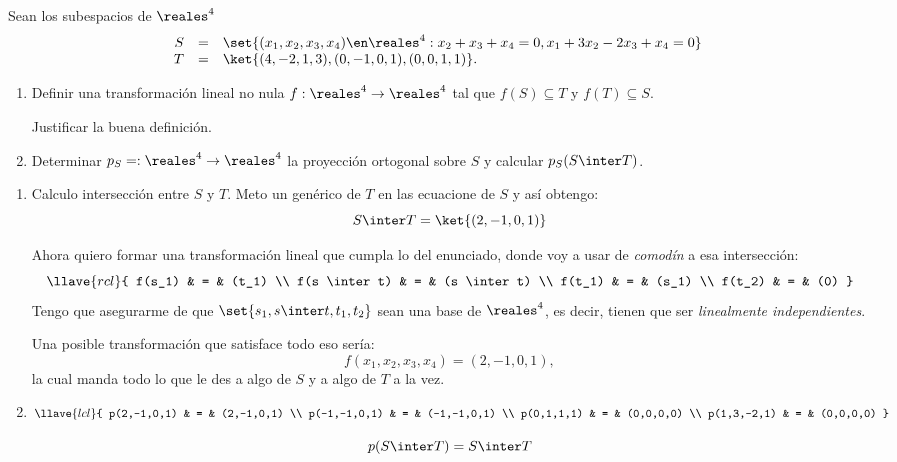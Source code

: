 \begin{enunciado}{\ejExtra}
  Sean los subespacios de $\reales^4$
  $$
    \begin{array}{rcl}
      S & = & \set{(x_1, x_2, x_3, x_4) \en \reales^4 : x_2 + x_3 + x_4 = 0, x_1 + 3x_2 - 2x_3 + x_4 = 0} \\
      T & = & \ket{(4, -2, 1, 3), (0, -1, 0, 1), (0,0,1,1)}.
    \end{array}
  $$
  \begin{enumerate}[label=\alph*)]
    \item Definir una transformación lineal no nula $f: \reales^4 \to \reales^4$ tal que $f(S) \subseteq T$ y
          $f(T) \subseteq S$.

          Justificar la buena definición.

    \item Determinar $p_S = : \reales^4 \to \reales^4$ la proyección ortogonal sobre $S$ y calcular $p_S(S \inter T)$.
  \end{enumerate}
\end{enunciado}

\begin{enumerate}[label=\alph*)]
  \item Calculo intersección entre $S$ y $T$. Meto un genérico de $T$ en las ecuacione de $S$ y así obtengo:
        $$
          S \inter T = \ket{(2,-1,0,1)}
        $$

        Ahora quiero formar una transformación lineal que cumpla lo del enunciado, donde voy a usar de \textit{comodín}
        a esa intersección:
        $$
          \llave{rcl}{
            f(s_1) & = & (t_1)  \\
            f(s \inter t) & = & (s \inter t) \\
            f(t_1) & = & (s_1) \\
            f(t_2) & = & (0)
          }
        $$
        Tengo que asegurarme de que $\set{s_1, s \inter t, t_1, t_2}$ sean una base de $\reales^4$, es decir,
        tienen que ser \textit{linealmente independientes}.

        Una posible transformación que satisface todo eso sería:
        $$
          f(x_1, x_2, x_3, x_4) = (2, -1, 0, 1),
        $$
        la cual manda todo lo que le des a algo de $S$ y a algo de $T$ a la vez.

  \item
        $$
          \llave{lcl}{
            p(2,-1,0,1) & = & (2,-1,0,1) \\
            p(-1,-1,0,1) & = & (-1,-1,0,1) \\
            p(0,1,1,1) & = & (0,0,0,0) \\
            p(1,3,-2,1) & = & (0,0,0,0)
          }
        $$
        
        $$
          p(S\inter T) = S\inter T
        $$
\end{enumerate}
